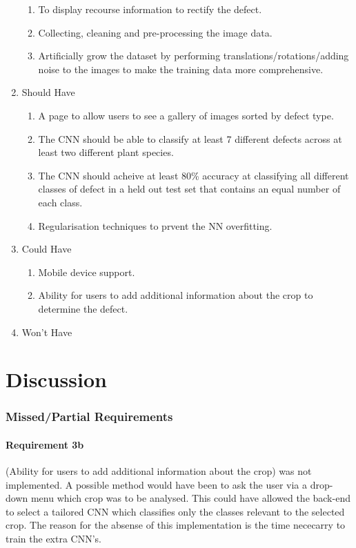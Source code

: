 \begin{enumerate}
\begin{enumerate}
      	\item To display recourse information to rectify the defect.\checkmark
      	\item Collecting, cleaning and pre-processing the image data. \checkmark
        \item Artificially grow the dataset by performing translations/rotations/adding noise to the images to make the training data more comprehensive.\checkmark
      \end{enumerate}
      \item Should Have
      \begin{enumerate}
        \item A page to allow users to see a gallery of images sorted by
          defect type. \checkmark
        \item The CNN should be able to classify at least 7 different defects across at least two different plant species. \checkmark
        \item The CNN should acheive at least 80\% accuracy at classifying all different classes of defect in a held out test set that contains an equal number of each class. \checkmark
      	\item Regularisation techniques to prvent the NN overfitting. \checkmark
      \end{enumerate}
      \item Could Have
      \begin{enumerate}
          \item Mobile device support. \checkmark
        \item Ability for users to add additional information about the crop
          to determine the defect.
      \end{enumerate}
      \item Won't Have
    \end{enumerate}

\section{Discussion}
\subsubsection{Missed/Partial Requirements}
  \paragraph{Requirement 3b}
   (Ability for users to add additional information about the crop) was not implemented. A possible method would have been to ask the user via a drop-down menu which crop was to be analysed. This could have allowed the back-end to select a tailored CNN which classifies only the classes relevant to the selected crop. The reason for the absense of this implementation is the time nececarry to train the extra CNN's.
